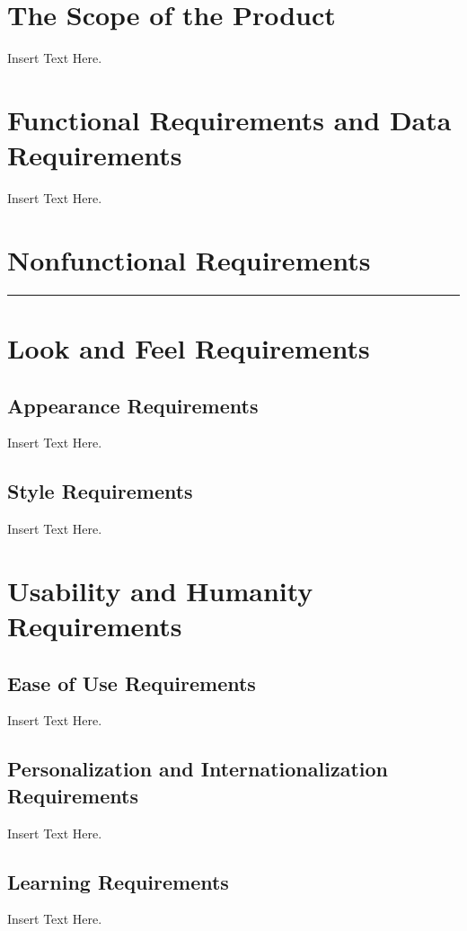 \documentclass [12pt]{article}
\begin{document}
\section{The Scope of the Product} 
Insert Text Here.

\section{Functional Requirements and Data Requirements} 
Insert Text Here.



\section *{\Large Nonfunctional Requirements\vspace*{-6mm}}\rule{6.5in}{.1em} 


\section {Look and Feel Requirements}
\subsection{Appearance Requirements}
Insert Text Here. 

\subsection{Style Requirements}
Insert Text Here. 


\section{Usability and Humanity Requirements} 
\subsection{Ease of Use Requirements}
Insert Text Here.

\subsection{Personalization and Internationalization Requirements}
Insert Text Here.

\subsection{Learning Requirements }
Insert Text Here.
\end{document}
